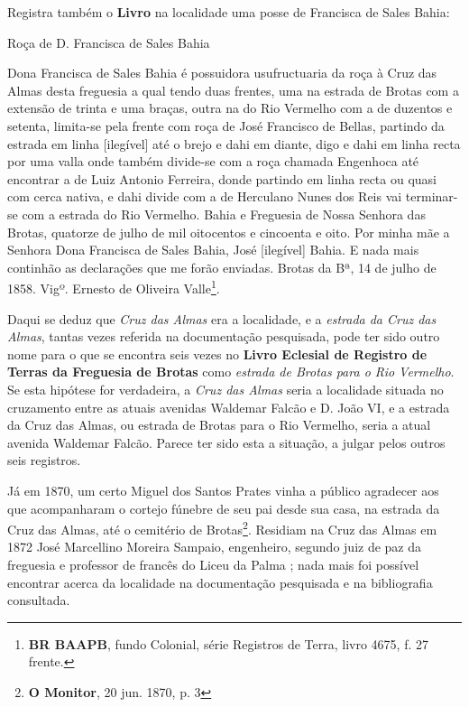 Registra também o \textbf{Livro} na localidade uma posse de Francisca de Sales Bahia:

\begin{citacao}
Roça de D. Francisca de Sales Bahia

Dona Francisca de Sales Bahia é possuidora usufructuaria da roça à Cruz das Almas desta freguesia a qual tendo duas frentes, uma na estrada de Brotas com a extensão de trinta e uma braças, outra na do Rio Vermelho com a de duzentos e setenta, limita-se pela frente com roça de José Francisco de Bellas, partindo da estrada em linha [ilegível] até o brejo e dahi em diante, digo e dahi em linha recta por uma valla onde também divide-se com a roça chamada Engenhoca até encontrar a de Luiz Antonio Ferreira, donde partindo em linha recta ou quasi com cerca nativa, e dahi divide com a de Herculano Nunes dos Reis vai terminar-se com a estrada do Rio Vermelho. Bahia e Freguesia de Nossa Senhora das Brotas, quatorze de julho de mil oitocentos e cincoenta e oito. Por minha mãe a Senhora Dona Francisca de Sales Bahia, José [ilegível] Bahia. E nada mais continhão as declarações que me forão enviadas. Brotas da Bª, 14 de julho de 1858. Vigº. Ernesto de Oliveira Valle\footnote{\textbf{BR BAAPB}, fundo Colonial, série Registros de Terra, livro 4675, f. 27 frente.}.
\end{citacao}

Daqui se deduz que \textit{Cruz das Almas} era a localidade, e a \textit{estrada da Cruz das Almas}, tantas vezes referida na documentação pesquisada, pode ter sido outro nome para o que se encontra seis vezes no \textbf{Livro Eclesial de Registro de Terras da Freguesia de Brotas} como \textit{estrada de Brotas para o Rio Vermelho}. Se esta hipótese for verdadeira, a \textit{Cruz das Almas} seria a localidade situada no cruzamento entre as atuais avenidas Waldemar Falcão e D. João VI, e a estrada da Cruz das Almas, ou estrada de Brotas para o Rio Vermelho, seria a atual avenida Waldemar Falcão. Parece ter sido esta a situação, a julgar pelos outros seis registros.

Já em 1870, um certo Miguel dos Santos Prates vinha a público agradecer aos que acompanharam o cortejo fúnebre de seu pai desde sua casa, na estrada da Cruz das Almas, até o cemitério de Brotas\footnote{\textbf{O Monitor}, 20 jun. 1870, p. 3}. Residiam na Cruz das Almas em 1872 José Marcellino Moreira Sampaio, engenheiro, segundo juiz de paz da freguesia e professor de francês do Liceu da Palma \cite[segunda~parte, pp.~96]{pimenta_almanak_1872}; nada mais foi possível encontrar acerca da localidade na documentação pesquisada e na bibliografia consultada.

